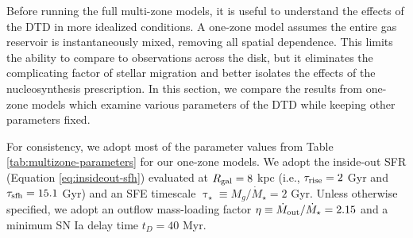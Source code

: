 \documentclass[twocolumn,twocolappendix,linenumbers,trackchanges]{aastex631}
\begin{document}

Before running the full multi-zone models, it is useful to understand the effects of the DTD in more idealized conditions. A one-zone model assumes the entire gas reservoir is instantaneously mixed, removing all spatial dependence. This limits the ability to compare to observations across the disk, but it eliminates the complicating factor of stellar migration and better isolates the effects of the nucleosynthesis prescription. In this section, we compare the results from one-zone models which examine various parameters of the DTD while keeping other parameters fixed.

For consistency, we adopt most of the parameter values from Table \ref{tab:multizone-parameters} for our one-zone models.
We adopt the inside-out SFR (Equation \ref{eq:insideout-sfh}) evaluated at $R_{\rm gal}=8$ kpc (i.e., $\tau_{\rm rise}=2$ Gyr and $\tau_{\rm sfh}=15.1$ Gyr) and an SFE timescale $\uptau_\star\equiv M_g/\dot M_\star=2$ Gyr. Unless otherwise specified, we adopt an outflow mass-loading factor $\eta\equiv \dot M_{\rm out}/\dot M_\star=2.15$  and a minimum SN Ia delay time $t_D=40$ Myr. 
\end{document}
